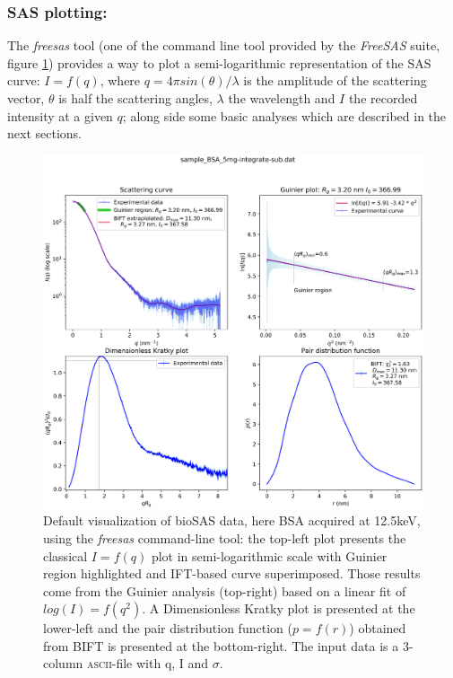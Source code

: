\documentclass[preprint]{iucr}              %
\begin{document}
\subsubsection{SAS plotting:} The \textit{freesas} tool (one of the command line tool provided by the \textit{FreeSAS} suite, figure \ref{plot}) provides a way to plot  a semi-logarithmic representation of the SAS curve: $I=f(q)$, where $q = 4\pi sin(\theta)/\lambda$ is the amplitude of the scattering vector, $\theta$ is half the scattering angles, $\lambda$ the wavelength and $I$ the recorded intensity at a given $q$; along side some basic analyses which are described in the next sections.

\begin{figure}
\label{plot}
\includegraphics[width=12cm]{Figure_1.eps}
\caption{Default visualization of bioSAS data, here BSA acquired at 12.5keV, using the \textit{freesas} command-line tool: the top-left plot presents the classical $I=f(q)$ plot in semi-logarithmic scale with Guinier region highlighted and IFT-based curve superimposed. Those results come from the Guinier analysis (top-right) based on a linear fit of $log(I)=f(q^2)$.
A Dimensionless Kratky plot is presented at the lower-left and the pair distribution function ($p=f(r)$) obtained from BIFT is presented at the bottom-right. 
The input data is a 3-column \textsc{ascii}-file with q, I and $\sigma$.}
\end{figure}
\end{document}
